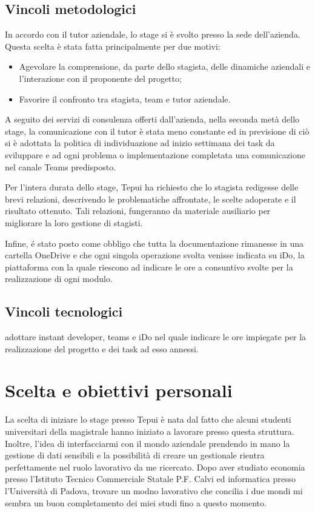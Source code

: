 \subsection{Vincoli metodologici}
In accordo con il tutor aziendale, lo stage si è svolto presso la sede dell'azienda. Questa scelta è stata fatta principalmente per due motivi: 
\begin{itemize}
	\item Agevolare la comprensione, da parte dello stagista, delle dinamiche aziendali e l’interazione con il proponente del progetto; 
	\item Favorire il confronto tra stagista, team e tutor aziendale.
\end{itemize}
A seguito dei servizi di consulenza offerti dall'azienda, nella seconda metà dello stage, la comunicazione con il tutor è stata meno constante ed in previsione di ciò si è adottata la politica di individuazione ad inizio settimana dei task da sviluppare e ad ogni problema o implementazione completata una comunicazione nel canale Teams predisposto.

Per l'intera durata dello stage, Tepui ha richiesto che lo stagista redigesse delle brevi relazioni, descrivendo le problematiche affrontate, le scelte adoperate e il risultato ottenuto. Tali relazioni, fungeranno da materiale ausiliario per migliorare la loro gestione di stagisti.

Infine, é stato posto come obbligo che tutta la documentazione rimanesse in una cartella OneDrive e che ogni singola operazione svolta venisse indicata su iDo, la piattaforma con la quale riescono ad indicare le ore a consuntivo svolte per la realizzazione di ogni modulo.


\subsection{Vincoli tecnologici}
adottare instant developer, teams e iDo nel quale indicare le ore impiegate per la realizzazione del progetto e dei task ad esso annessi.


\section{Scelta e obiettivi personali}
La scelta di iniziare lo stage presso Tepui è nata dal fatto che alcuni studenti universitari della magistrale hanno iniziato a lavorare presso questa struttura. Inoltre, l'idea di interfacciarmi con il mondo aziendale prendendo in mano la gestione di dati sensibili e la possibilità di creare un gestionale rientra perfettamente nel ruolo lavorativo da me ricercato. Dopo aver studiato economia presso l'Istituto Tecnico Commerciale Statale P.F. Calvi ed informatica presso l'Università di Padova, trovare un modno lavorativo che concilia i due mondi mi sembra un buon completamento dei miei studi fino a questo momento.\\

